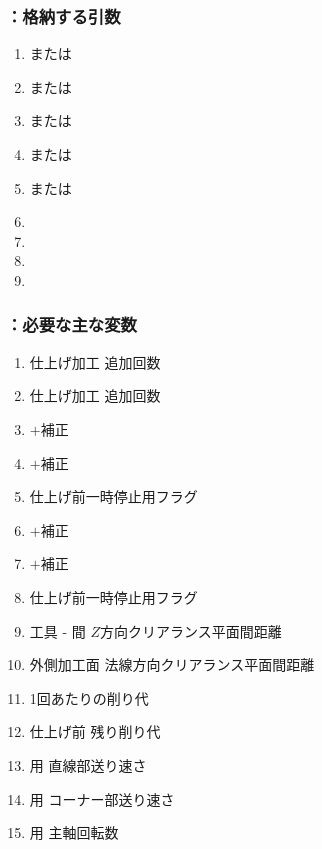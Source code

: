 \subsubsection{\KOutcutRLeft：格納する引数}
\begin{enumerate}[label*=\sarrow]
\item \PMTopOutcutACWidth または\PMBottomOutcutACWidth
\item \PMTopOutcutBDWidth または\PMBottomOutcutBDWidth
\item \PMTopOutcutCornerR または\PMBottomOutcutCornerR
\item \PMTopOutcutLength または\PMBottomOutcutLength
\item \PMTopReAlocationLength または\PMBottomReAlocationLength
\item \PMACOD
\item \PMBDOD
\item \PMKeywayPos
\item \PMKeywayWidth
\end{enumerate}

\subsubsection{\KOutcutRLeft：必要な主な変数}
\begin{enumerate}[label*=\sarrow]
\item \TopOutcut{} 仕上げ加工 追加回数
\item \BottomOutcut{} 仕上げ加工 追加回数
\item \TopOutcutAsideThickness$+$補正
\item \TopOutcutWidth$+$補正
\item \TopOutcut{} 仕上げ前一時停止用フラグ
\item \BottomOutcutAsideThickness$+$補正
\item \BottomOutcutWidth$+$補正
\item \BottomOutcut{} 仕上げ前一時停止用フラグ
\item 工具 - \EndFace 間 $Z$方向クリアランス平面間距離
\item 外側加工面 法線方向クリアランス平面間距離
\item \OutcutMilling1回あたりの削り代
\item \OutcutMilling{} 仕上げ前 残り削り代
\item \OutcutMilling 用 直線部送り速さ
\item \OutcutMilling 用 コーナー部送り速さ
\item \OutcutMilling 用 主軸回転数
\end{enumerate}


